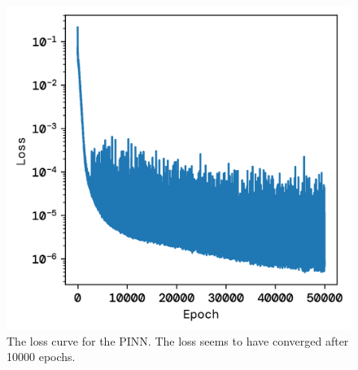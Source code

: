 \documentclass[twoside,11pt]{report}
\begin{document}
\begin{figure}[!ht]
\begin{minipage}[t]{0.5\textwidth - 1mm}
\begin{center}
                \includegraphics[width=\textwidth]{../runsAndFigures/wave_tf_pinn_loss.png}
            \end{center}
            \caption
            {
                The loss curve for the PINN. The loss seems to have converged after 10000 epochs.
            }\label{fig:wave_tf_dnn}
        \end{minipage}
    \end{figure}
\end{document}
